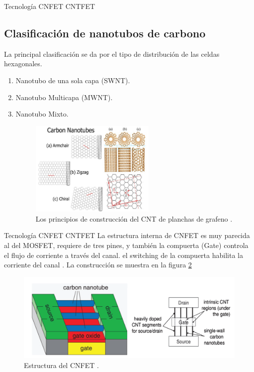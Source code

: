 \documentclass[aspectratio=169, 8pt]{beamer}
\begin{document}
\begin{frame}{Tecnología CNFET CNTFET}
	\subsection{Clasificación de nanotubos de carbono}
	
	La principal clasificación se da por el tipo de distribución de las celdas hexagonales.
	
	\begin{enumerate}
		\item Nanotubo de una sola capa (SWNT).\\
		\item Nanotubo Multicapa (MWNT). \\
		\item Nanotubo Mixto.
		
		\begin{figure}[h!]
			\centering
			\includegraphics[width=6cm]{IMAGENES/img12}
			\caption{Los principios de construcción del CNT de planchas de grafeno \cite{PerformanceAnalysisofClassical2018} .}
			\label{img12}
		\end{figure}
		
	\end{enumerate}
\end{frame}



\begin{frame}{Tecnología CNFET CNTFET}
	La estructura interna de CNFET es muy parecida al del MOSFET, requiere de tres pines, y también la compuerta (Gate) controla el flujo de corriente a través del canal. el switching de la compuerta habilita  la corriente del canal \cite{PerformanceAnalysisofClassical2018}. La construcción se muestra en la figura \ref{img13}
	
	\begin{figure}[h!]
		\centering
		\includegraphics[width=12cm]{IMAGENES/img13}
		\caption{Estructura del CNFET \cite{Performanceinvestigationofemerging2016}.}
		\label{img13}
	\end{figure}
\end{frame}
\end{document}

